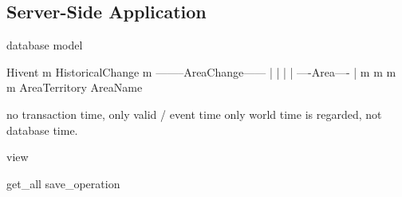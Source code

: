 
\subsection{Server-Side Application} %
\label{sub:server_side_application}

database model

           Hivent
             m
       HistoricalChange
             m
  --------AreaChange------
  |          |           |
  |     ----Area----     |
  m     m          m     m
AreaTerritory      AreaName

no transaction time, only valid / event time
only world time is regarded, not database time.

view

get\_all
save\_operation




